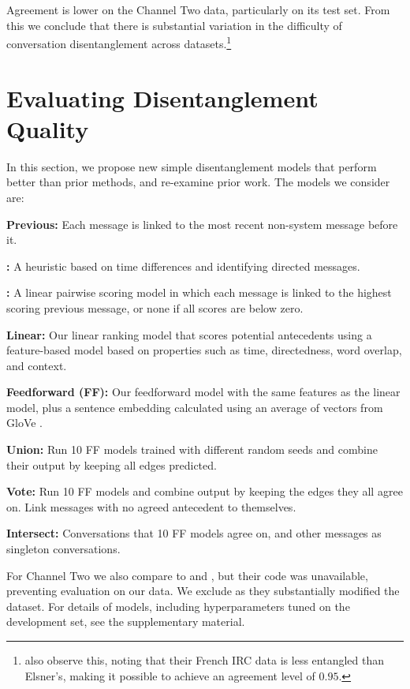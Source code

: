 \documentclass[11pt,a4paper]{article}
\newcommand{\tightparagraph}[1]{\noindent\textbf{#1:}}
\begin{document}
Agreement is lower on the Channel Two data, particularly on its test set.
From this we conclude that there is substantial variation in the difficulty of conversation disentanglement across datasets.\footnote{
  \citet{Riou:2015} also observe this, noting that their French IRC data is less entangled than Elsner's, making it possible to achieve an agreement level of $0.95$.
}

\section{Evaluating Disentanglement Quality}

In this section, we propose new simple disentanglement models that perform better than prior methods, and re-examine prior work.
The models we consider are:

\tightparagraph{Previous} Each message is linked to the most recent non-system message before it.

\tightparagraph{\citet{Lowe:2017:DD}} A heuristic based on time differences and identifying directed messages.

\tightparagraph{\citet{elsner:2008}} A linear pairwise scoring model in which each message is linked to the highest scoring previous message, or none if all scores are below zero.

\tightparagraph{Linear} Our linear ranking model that scores potential antecedents using a feature-based model based on properties such as time, directedness, word overlap, and context.

\tightparagraph{Feedforward (FF)} Our feedforward model with the same features as the linear model, plus a sentence embedding calculated using an average of vectors from GloVe \citep{glove}.

\tightparagraph{Union} Run 10 FF models trained with different random seeds and combine their output by keeping all edges predicted.

\tightparagraph{Vote} Run 10 FF models and combine output by keeping the edges they all agree on. Link messages with no agreed antecedent to themselves.

\tightparagraph{Intersect} Conversations that 10 FF models agree on, and other messages as singleton conversations.

For Channel Two we also compare to \citet{Wang:2009} and \citet{Mehri:2017:IJCNLP}, but their code was unavailable, preventing evaluation on our data.
We exclude \citet{Jiang:NAACL:2018} as they substantially modified the dataset.
For details of models, including hyperparameters tuned on the development set, see the supplementary material.
\end{document}
